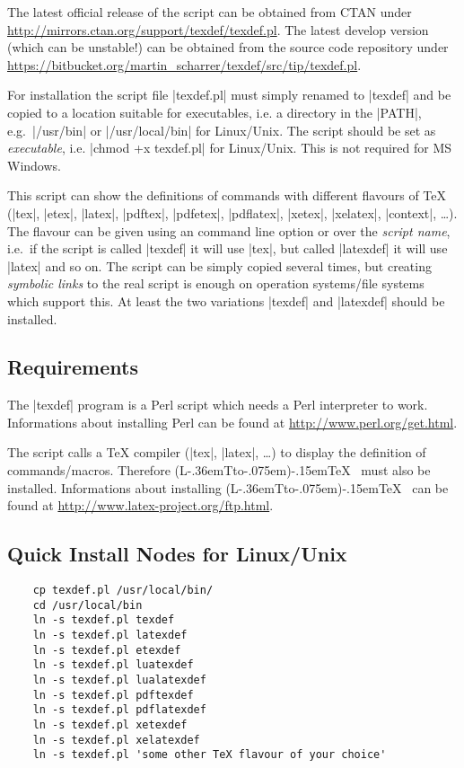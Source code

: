 \documentclass{ydoc}
\makeatletter
\DeclareRobustCommand{\LATeX}{%
    (L\kern -.36em{\sbox \z@ T\vbox to\ht \z@ {\hbox {\check@mathfonts \fontsize \sf@size \z@ \math@fontsfalse \selectfont A}\vss }}\kern -.075em)\kern -.15em\TeX
}
\makeatother
\begin{document}
The latest official release of the script can be obtained from CTAN under \url{http://mirrors.ctan.org/support/texdef/texdef.pl}.
The latest develop version (which can be unstable!) can be obtained from the source code repository under 
\url{https://bitbucket.org/martin_scharrer/texdef/src/tip/texdef.pl}.

For installation the script file |texdef.pl| must simply renamed to |texdef| and be copied to a location suitable for executables,
i.e. a directory in the |PATH|, e.g.\ |/usr/bin| or |/usr/local/bin| for Linux/Unix.
The script should be set as \emph{executable}, i.e. |chmod +x texdef.pl| for Linux/Unix.
This is not required for MS Windows.

This script can show the definitions of commands with different flavours of TeX
(|tex|, |etex|, |latex|, |pdftex|, |pdfetex|, |pdflatex|, |xetex|, |xelatex|, |context|, \ldots).
The flavour can be given using an command line option or over the \emph{script name},
i.e.\ if the script is called |texdef| it will use |tex|, but called |latexdef|
it will use |latex| and so on.
The script can be simply copied several times, but creating \emph{symbolic links}
to the real script is enough on operation systems/file systems which support
this.
At least the two variations |texdef| and |latexdef| should be installed.


\subsection*{Requirements}

The |texdef| program is a Perl script which needs a Perl interpreter to work.
Informations about installing Perl can be found at \url{http://www.perl.org/get.html}.

The script calls a TeX compiler (|tex|, |latex|, \ldots) to display the definition of commands/macros.
Therefore \LATeX\ must also be installed.
Informations about installing \LATeX\ can be found at \url{http://www.latex-project.org/ftp.html}.




\subsection*{Quick Install Nodes for Linux/Unix}

\begin{verbatim}
    cp texdef.pl /usr/local/bin/
    cd /usr/local/bin
    ln -s texdef.pl texdef
    ln -s texdef.pl latexdef
    ln -s texdef.pl etexdef
    ln -s texdef.pl luatexdef
    ln -s texdef.pl lualatexdef
    ln -s texdef.pl pdftexdef
    ln -s texdef.pl pdflatexdef
    ln -s texdef.pl xetexdef
    ln -s texdef.pl xelatexdef
    ln -s texdef.pl 'some other TeX flavour of your choice'
\end{verbatim}
\end{document}
